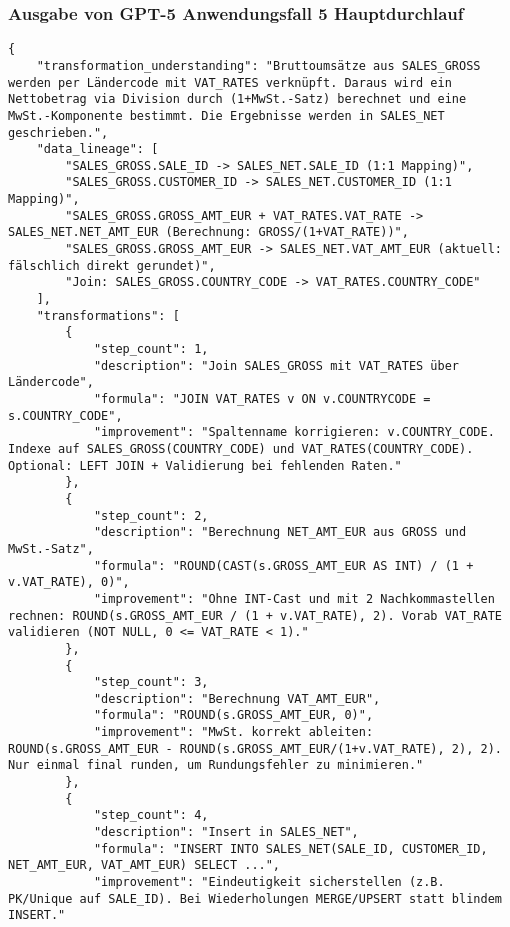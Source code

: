 \subsubsection{Ausgabe von GPT-5 Anwendungsfall 5 Hauptdurchlauf}\label{anhang:subsubsec:gpt_case5_prompt1}
\begin{lstlisting}[caption={Ausgabe: GPT-5 Anwendungsfall 5 Hauptdurchlauf},label={gpt_case5_prompt1}]
{
    "transformation_understanding": "Bruttoumsätze aus SALES_GROSS werden per Ländercode mit VAT_RATES verknüpft. Daraus wird ein Nettobetrag via Division durch (1+MwSt.-Satz) berechnet und eine MwSt.-Komponente bestimmt. Die Ergebnisse werden in SALES_NET geschrieben.",
    "data_lineage": [
        "SALES_GROSS.SALE_ID -> SALES_NET.SALE_ID (1:1 Mapping)",
        "SALES_GROSS.CUSTOMER_ID -> SALES_NET.CUSTOMER_ID (1:1 Mapping)",
        "SALES_GROSS.GROSS_AMT_EUR + VAT_RATES.VAT_RATE -> SALES_NET.NET_AMT_EUR (Berechnung: GROSS/(1+VAT_RATE))",
        "SALES_GROSS.GROSS_AMT_EUR -> SALES_NET.VAT_AMT_EUR (aktuell: fälschlich direkt gerundet)",
        "Join: SALES_GROSS.COUNTRY_CODE -> VAT_RATES.COUNTRY_CODE"
    ],
    "transformations": [
        {
            "step_count": 1,
            "description": "Join SALES_GROSS mit VAT_RATES über Ländercode",
            "formula": "JOIN VAT_RATES v ON v.COUNTRYCODE = s.COUNTRY_CODE",
            "improvement": "Spaltenname korrigieren: v.COUNTRY_CODE. Indexe auf SALES_GROSS(COUNTRY_CODE) und VAT_RATES(COUNTRY_CODE). Optional: LEFT JOIN + Validierung bei fehlenden Raten."
        },
        {
            "step_count": 2,
            "description": "Berechnung NET_AMT_EUR aus GROSS und MwSt.-Satz",
            "formula": "ROUND(CAST(s.GROSS_AMT_EUR AS INT) / (1 + v.VAT_RATE), 0)",
            "improvement": "Ohne INT-Cast und mit 2 Nachkommastellen rechnen: ROUND(s.GROSS_AMT_EUR / (1 + v.VAT_RATE), 2). Vorab VAT_RATE validieren (NOT NULL, 0 <= VAT_RATE < 1)."
        },
        {
            "step_count": 3,
            "description": "Berechnung VAT_AMT_EUR",
            "formula": "ROUND(s.GROSS_AMT_EUR, 0)",
            "improvement": "MwSt. korrekt ableiten: ROUND(s.GROSS_AMT_EUR - ROUND(s.GROSS_AMT_EUR/(1+v.VAT_RATE), 2), 2). Nur einmal final runden, um Rundungsfehler zu minimieren."
        },
        {
            "step_count": 4,
            "description": "Insert in SALES_NET",
            "formula": "INSERT INTO SALES_NET(SALE_ID, CUSTOMER_ID, NET_AMT_EUR, VAT_AMT_EUR) SELECT ...",
            "improvement": "Eindeutigkeit sicherstellen (z.B. PK/Unique auf SALE_ID). Bei Wiederholungen MERGE/UPSERT statt blindem INSERT."

\end{lstlisting}
